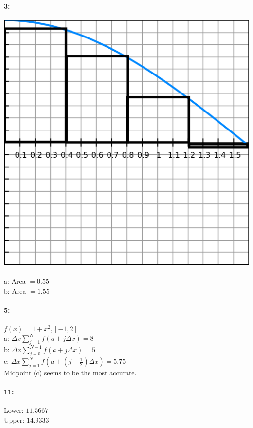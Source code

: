 \documentclass[12pt]{article}
\begin{document}
    \paragraph*{3:\\}
    \includegraphics[scale=.333]{3.png}\\\\
    a: Area $ = 0.55$\\
    b: Area $ = 1.55$\\
    
    \paragraph*{5:\\}
    $f(x) = 1 + x^2, [-1, 2]$\\
    a: $\Delta x \sum\limits_{j=1}^{N}f(a + j \Delta x) = 8$\\
    b: $\Delta x \sum\limits_{j=0}^{N-1}f(a + j \Delta x) = 5$\\
    c: $\Delta x \sum\limits_{j=1}^{N}f(a + (j-\frac{1}{2}) \Delta x) = 5.75$\\
    Midpoint (c) seems to be the most accurate.

    \paragraph*{11:\\}
    Lower: $11.5667$\\
    Upper: $14.9333$\\
\end{document}
